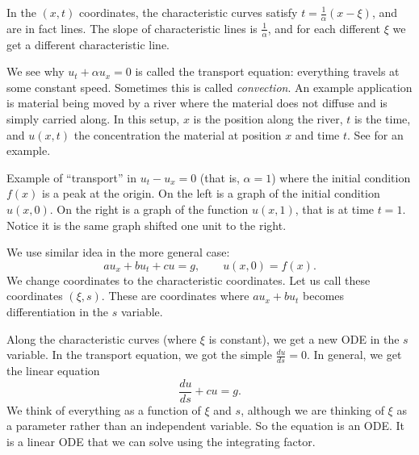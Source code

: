 \documentclass{ximera}
\begin{document}
\begin{exampleSol}
    In the $(x,t)$ coordinates, the characteristic curves satisfy  $t = \frac{1}{\alpha} ( x- \xi)$, and are in fact lines. The slope of characteristic lines is $\frac{1}{\alpha}$, and for each different $\xi$ we get a different characteristic line.
    
    We see why $u_t + \alpha u_x = 0$ is called the transport equation: everything travels at some constant speed. Sometimes this is called \emph{convection}. An example application is material being moved by a river where the material does not diffuse and is simply carried along.  In this setup, $x$ is the position along the river, $t$ is the time, and $u(x,t)$ the concentration the material at position $x$ and time $t$.  See  for an example.
    \begin{myfig}
        \capstart
        \caption{Example of ``transport'' in $u_t-u_x = 0$ (that is, $\alpha = 1$) where the initial condition $f(x)$ is a peak at the origin.  On the left is a graph of the initial condition $u(x,0)$.  On the right is a graph of the function $u(x,1)$, that is at time $t=1$.  Notice it is the same graph shifted one unit to the right.\label{fopde:transportfig}}
    \end{myfig}
\end{exampleSol}

We use similar idea in the more general case:
\begin{equation*}
    a u_x + b u_t + c u = g, \qquad u(x,0) = f(x)  .
\end{equation*}
We change coordinates to the characteristic coordinates. Let us call these coordinates $(\xi,s)$. These are coordinates where $a u_x + b u_t$ becomes differentiation in the $s$ variable.

Along the characteristic curves (where $\xi$ is constant), we get a new ODE in the $s$ variable.  In the transport equation, we got the simple $\frac{du}{ds} = 0$.  In general, we get the linear equation
\begin{equation} \label{eq:fopde:charode}
    \frac{du}{ds} + c u = g.
\end{equation}
We think of everything as a function of $\xi$ and $s$, although we are thinking of $\xi$ as a parameter rather than an independent variable. So the equation is an ODE\@.  It is a linear ODE that we can solve using the integrating factor.
\end{document}
